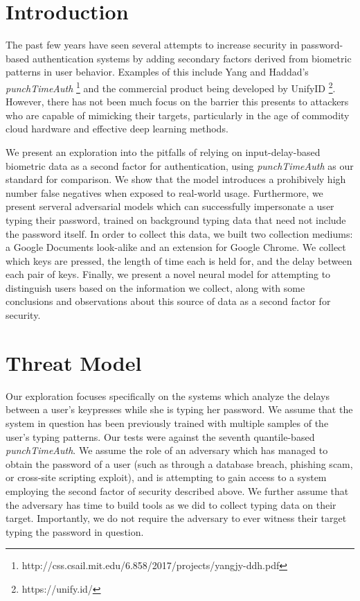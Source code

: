 \documentclass{amsart}
\begin{document}
\begin{multicols*}{2}
\section{Introduction}

The past few years have seen several attempts to increase security in password-based authentication systems by adding secondary factors derived from biometric patterns in user behavior. Examples of this include Yang and Haddad's \textit{punchTimeAuth} \footnote{http://css.csail.mit.edu/6.858/2017/projects/yangjy-ddh.pdf} and the commercial product being developed by UnifyID \footnote{https://unify.id/}. However, there has not been much focus on the barrier this presents to attackers who are capable of mimicking their targets, particularly in the age of commodity cloud hardware and effective deep learning methods.

We present an exploration into the pitfalls of relying on input-delay-based biometric data as a second factor for authentication, using \textit{punchTimeAuth} as our standard for comparison. We show that the model introduces a prohibively high number false negatives when exposed to real-world usage. Furthermore, we present serveral adversarial models which can successfully impersonate a user typing their password, trained on background typing data that need not include the password itself. In order to collect this data, we built two collection mediums: a Google Documents look-alike and an extension for Google Chrome. We collect which keys are pressed, the length of time each is held for, and the delay between each pair of keys. Finally, we present a novel neural model for attempting to distinguish users based on the information we collect, along with some conclusions and observations about this source of data as a second factor for security.

\section{Threat Model}

Our exploration focuses specifically on the systems which analyze the delays between a user's keypresses while she is typing her password. We assume that the system in question has been previously trained with multiple samples of the user's typing patterns. Our tests were against the seventh quantile-based \textit{punchTimeAuth}. We assume the role of an adversary which has managed to obtain the password of a user (such as through a database breach, phishing scam, or cross-site scripting exploit), and is attempting to gain access to a system employing the second factor of security described above. We further assume that the adversary has time to build tools as we did to collect typing data on their target. Importantly, we do not require the adversary to ever witness their target typing the password in question.


\end{multicols*}
\end{document}
